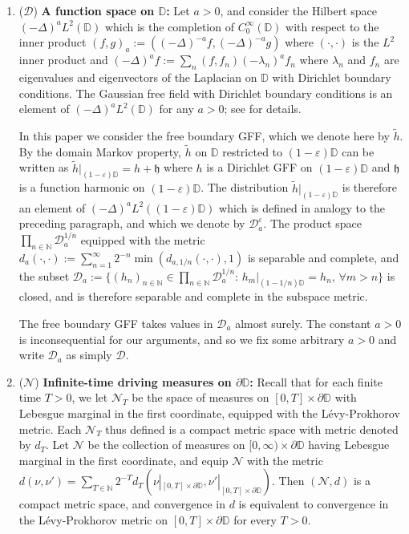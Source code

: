 \documentclass[a4paper]{article}
\numberwithin{equation}{section}
\def\epsilon{\varepsilon}
\def\eps{\varepsilon}
\newcommand{\wt}{\widetilde}
\newcommand{\D}{\mathbb{D}}
\newcommand{\N}{\mathbb{N}}
\newcommand{\cN}{\mathcal{N}}
\theoremstyle{remark}
\numberwithin{equation}{section}
\begin{document}
\begin{enumerate}
    \item ($\mathcal{D}$) \textbf{A function space on $\mathbb{D}$:} 
    Let $a>0$, and consider the Hilbert space $(-\Delta)^a L^2(\D)$ which is the completion of $C_0^{\infty}(\D)$ with respect to the inner product $(f, g)_{a} :=  ((-\Delta)^{-a}f, (-\Delta)^{-a}g)$ where $(\cdot, \cdot)$ is the $L^2$ inner product and $(-\Delta)^{a} f := \sum_{n} (f, f_n)  (-\lambda_n)^a f_n$ where $\lambda_n$ and $f_n$ are eigenvalues and eigenvectors of the Laplacian on $\D$ with Dirichlet boundary conditions.  The Gaussian free field with Dirichlet boundary conditions is an element of $(-\Delta)^a L^2(\D)$ for any $a>0$; see \cite{shef-gff} for details.

    
    In this paper we consider the free boundary GFF, which we denote here by $\wt h$. By the domain Markov property, $\wt h$ on $\D$ restricted to $(1 - \epsilon)\D$ can be written as $\wt h|_{(1 - \eps)\D} = h + \mathfrak{h}$ where $h$ is a Dirichlet GFF on $(1 - \epsilon)\D$ and $\mathfrak{h}$ is a function harmonic on $(1 - \eps)\D$. The distribution $\wt h|_{(1 - \eps)\D}$ is therefore an element of $(-\Delta)^a L^2((1 - \epsilon)\D)$ which is defined in analogy to the preceding paragraph, and which we denote by $\mathcal{D}_a^{\epsilon}$. The product space $\prod_{n \in \N}\mathcal{D}_a^{1/n}$ equipped with the metric $d_a(\cdot, \cdot) := \sum_{n = 1}^{\infty}2^{-n}\min(d_{a, 1/n}(\cdot, \cdot), 1)$ is separable and complete, and the subset $\mathcal{D}_a := \{ (h_n)_{n \in \N} \in \prod_{n \in \N}\mathcal{D}_a^{1/n}: \, h_m|_{(1 - 1/n)\D} = h_n ,\, \forall m > n \}$ is closed, and is therefore separable and complete in the subspace metric.
    
    The free boundary GFF takes values in $\mathcal{D}_a$ almost surely. The constant $a > 0$ is inconsequential for our arguments, and so we fix some arbitrary $a > 0$ and write $\mathcal{D}_a$ as simply $\mathcal{D}$.
    

    \item ($\mathcal{N}$) \textbf{Infinite-time driving measures on $\partial \D$:} Recall that for each finite time $T >0$, we let $\mathcal{N}_T$ be the space of measures on $[0, T] \times \partial \D$ with Lebesgue marginal in the first coordinate, equipped with the L\'evy-Prokhorov metric. Each $\mathcal{N}_T$ thus defined is a compact metric space with metric denoted by $d_T$. Let $\mathcal{N}$ be the collection of measures on $[0, \infty) \times \partial \D$ having Lebesgue marginal in the first coordinate, and equip $\mathcal N$ with the metric $d(\nu, \nu') = \sum_{T \in \mathbb N} 2^{-T} d_T(\nu|_{[0,T] \times \partial \D}, \nu'|_{[0,T] \times \partial \D})$. Then $(\cN, d)$ is a compact metric space, and convergence in $d$ is equivalent to convergence in the L\'evy-Prokhorov metric on $[0,T] \times \partial \D$ for every $T>0$. 


\end{enumerate}
\end{document}

